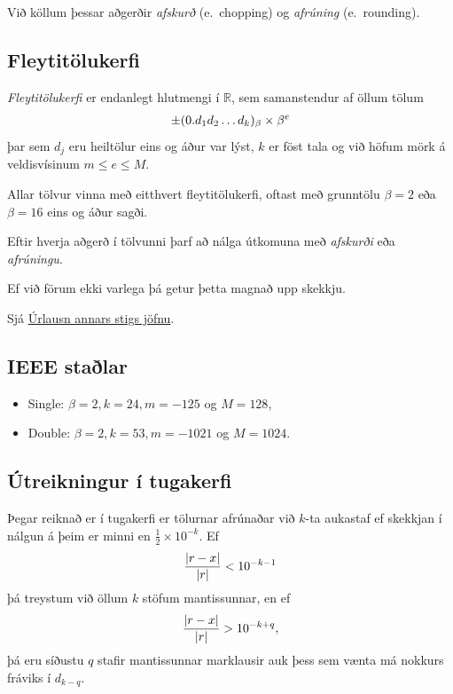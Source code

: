\documentclass[A4paper,10pt,icelandic]{sphinxmanual}
\begin{document}
Við köllum þessar aðgerðir \emph{afskurð} (e. chopping) og \emph{afrúning}
(e. rounding).


\subsection{Fleytitölukerfi}
\label{kafli01:fleytitolukerfi}
\emph{Fleytitölukerfi} er endanlegt hlutmengi í \({\mathbb  R}\), sem
samanstendur af öllum tölum
\begin{gather}
\begin{split}\pm (0.d_1d_2\dots d_k)_\beta\times \beta^e\end{split}\notag
\end{gather}
þar sem \(d_j\) eru heiltölur eins og áður var lýst, \(k\) er
föst tala og við höfum mörk á veldisvísinum \(m\leq e\leq M\).

Allar tölvur vinna með eitthvert fleytitölukerfi, oftast með grunntölu
\(\beta=2\) eða \(\beta=16\) eins og áður sagði.

Eftir hverja aðgerð í tölvunni þarf að nálga útkomuna með \emph{afskurði} eða
\emph{afrúningu}.

Ef við förum ekki varlega þá getur þetta magnað upp skekkju.

Sjá {\hyperref[kafli01:urlausn-annars-stigs-jofnu]{Úrlausn annars stigs jöfnu}}.


\subsection{IEEE staðlar}
\label{kafli01:ieee-stalar}\begin{itemize}
\item {} 
Single: \(\beta = 2, k=24, m=-125\) og \(M = 128\),

\item {} 
Double: \(\beta = 2, k=53, m=-1021\) og \(M = 1024\).

\end{itemize}


\subsection{Útreikningur í tugakerfi}
\label{kafli01:utreikningur-i-tugakerfi}
Þegar reiknað er í tugakerfi er tölurnar afrúnaðar við \(k\)-ta
aukastaf ef skekkjan í nálgun á þeim er minni en
\(\frac 12\times 10^{-k}\). Ef
\begin{gather}
\begin{split}\dfrac{|r-x|}{|r|}<10^{-k-1}\end{split}\notag
\end{gather}
þá treystum við öllum \(k\) stöfum mantissunnar, en ef
\begin{gather}
\begin{split}\dfrac{|r-x|}{|r|}>10^{-k+q},\end{split}\notag
\end{gather}
þá eru síðustu \(q\) stafir mantissunnar marklausir auk þess sem
vænta má nokkurs fráviks í \(d_{k-q}\).
\end{document}
